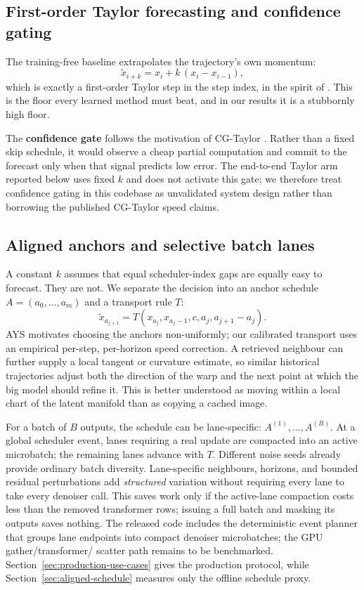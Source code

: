 \documentclass[11pt,a4paper]{article}
\begin{document}
\subsection{First-order Taylor forecasting and confidence gating}

The training-free baseline extrapolates the trajectory's own momentum:
\begin{equation}
  \tilde{x}_{i+k} = x_i + k\,(x_i - x_{i-1}),
  \label{eq:taylor}
\end{equation}
which is exactly a first-order Taylor step in the step index, in the spirit of
\citet{liu2025taylorseer}. This is the floor every learned method must beat, and
in our results it is a stubbornly high floor.

The \textbf{confidence gate} follows the motivation of CG-Taylor
\citep{guan2025cgtaylor}. Rather than a fixed skip schedule, it would observe a
cheap partial computation and commit to the forecast only when that signal
predicts low error. The end-to-end Taylor arm reported below uses fixed $k$ and
does not activate this gate; we therefore treat confidence gating in this
codebase as unvalidated system design rather than borrowing the published
CG-Taylor speed claims.

\subsection{Aligned anchors and selective batch lanes}

A constant $k$ assumes that equal scheduler-index gaps are equally easy to
forecast. They are not. We separate the decision into an anchor schedule
$A=(a_0,\ldots,a_m)$ and a transport rule $T$:
\begin{equation}
  \tilde{x}_{a_{j+1}} =
  T(x_{a_j},x_{a_j-1},c,a_j,a_{j+1}-a_j).
\end{equation}
AYS motivates choosing the anchors non-uniformly; our calibrated transport uses
an empirical per-step, per-horizon speed correction. A retrieved neighbour can
further supply a local tangent or curvature estimate, so similar historical
trajectories adjust both the direction of the warp and the next point at which
the big model should refine it. This is better understood as moving within a
local chart of the latent manifold than as copying a cached image.

For a batch of $B$ outputs, the schedule can be lane-specific:
$A^{(1)},\ldots,A^{(B)}$. At a global scheduler event, lanes requiring a real
update are compacted into an active microbatch; the remaining lanes advance
with $T$. Different noise seeds already provide ordinary batch diversity.
Lane-specific neighbours, horizons, and bounded residual perturbations add
\emph{structured} variation without requiring every lane to take every
denoiser call. This saves work only if the active-lane compaction costs less than
the removed transformer rows; issuing a full batch and masking its outputs saves
nothing. The released code includes the deterministic event planner that groups
lane endpoints into compact denoiser microbatches; the GPU gather/transformer/
scatter path remains to be benchmarked. Section~\ref{sec:production-use-cases} gives the production protocol,
while Section~\ref{sec:aligned-schedule} measures only the offline schedule
proxy.
\end{document}
